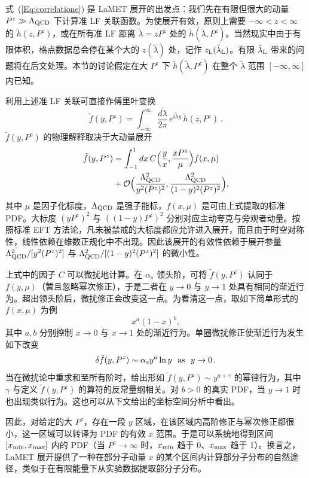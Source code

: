 式~(\ref{Eq:correlatione}) 是 LaMET 展开的出发点：我们先在有限但很大的动量 $P^z\gg\Lambda_{\rm QCD}$ 下计算准 LF 关联函数。为使展开有效，原则上需要 $-\infty<z<\infty$ 的 ${\tilde h}(z, P^z)$，或在所有准 LF 距离 $\tilde \lambda=z P^z$ 处的 ${\tilde h}(\tilde \lambda, P^z)$。当然现实中由于有限体积，格点数据总会停在某个大的 $z(\tilde \lambda)$ 处，记作 $z_{\rm L}(\tilde \lambda_{\rm L})$。有限 $\tilde \lambda_{\rm L}$ 带来的问题将在后文处理。本节的讨论假定在大 $P^z$ 下 $\tilde h(\tilde \lambda, P^z)$ 在整个 $\tilde \lambda$ 范围 $[-\infty,\infty]$ 内已知。

利用上述准 LF 关联可直接作傅里叶变换
\begin{equation}
    {\tilde f}(y,P^z) =\int^\infty_{-\infty} \frac{d\tilde \lambda}{2\pi}\, e^{i\tilde \lambda y}\, \tilde h(z, P^z)\ .
\end{equation}
${\tilde f}(y,P^z)$ 的物理解释取决于大动量展开~\cite{Ji:2013dva,Xiong:2013bka,Ma:2014jla,Izubuchi:2018srq}
\begin{align}\label{matching}
    {\tilde f}(y, P^z) &= \int^1_{-1} dx\, C\Big(\frac y x, \frac{xP^z}{\mu}\Big) f(x, \mu) \nonumber \\
    &+ {\cal O}\Big(\frac{\Lambda^2_{\rm QCD}}{y^2(P^z)^2}, \frac{\Lambda^2_{\rm QCD}}{(1-y)^2(P^z)^2}\Big),
\end{align}
其中 $\mu$ 是因子化标度，$\Lambda_{\rm QCD}$ 是强子能标，$f(x,\mu)$ 是可由上式提取的标准 PDF。大标度 $(yP^z)^2$ 与 $((1-y)P^z)^2$ 分别对应主动夸克与旁观者动量。按照标准 EFT 方法论，凡未被禁戒的大标度都应允许进入展开，而且由于时空对称性，线性依赖在维数正规化中不出现。因此该展开的有效性依赖于展开参量 $\Lambda^2_{\rm QCD}/[y^2(P^z)^2]$ 与 $\Lambda^2_{\rm QCD}/[(1-y)^2(P^z)^2]$ 的微小性。

上式中的因子 $C$ 可以微扰地计算。在 $\alpha_s$ 领头阶，可将 $\tilde f(y, P^z)$ 认同于 $f(y,\mu)$（暂且忽略幂次修正），于是二者在 $y\to 0$ 与 $y\to1$ 处具有相同的渐近行为。超出领头阶后，微扰修正会改变这一点。为看清这一点，取如下简单形式的 $f(x, \mu)$ 为例
\begin{equation}
x^a (1-x)^b,
\end{equation}
其中 $a, b$ 分别控制 $x\to 0$ 与 $x\to 1$ 处的渐近行为。单圈微扰修正使渐近行为发生如下改变
\begin{align}
\delta\tilde f(y, P^z)\sim \alpha_s y^a \ln y \ \  {\rm as}\ \  y\to 0\,.
\end{align}
当在微扰论中重求和至所有阶时，给出形如 $\tilde f(y, P^z)\sim  y^{a+\gamma}$ 的幂律行为，其中 $\gamma$ 与定义 $\tilde f(y, P^z)$ 的算符的反常量纲相关。对 $b>0$ 的真实 PDF，当 $y\to 1$ 时也出现类似行为。这也可以从下文给出的坐标空间分析中看出。

因此，对给定的大 $P^z$，存在一段 $y$ 区域，在该区域内高阶修正与幂次修正都很小，这一区域可以转译为 PDF 的有效 $x$ 范围。于是可以系统地得到区间 $[x_{\rm min}, x_{\rm max}]$ 内的 PDF（当 $P^z\to \infty$ 时，$x_{\rm min}$ 趋于 0、$x_{\rm max}$ 趋于 1）。换言之，LaMET 展开提供了一种在部分子动量 $x$ 的某个区间内计算部分子分布的自然途径，类似于在有限能量下从实验数据提取部分子分布。
